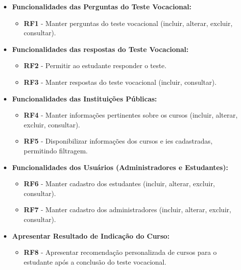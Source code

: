 \begin{itemize}
    \item \textbf{Funcionalidades das Perguntas do Teste Vocacional:}
    \begin{itemize}
        \item \textbf{RF1} - Manter perguntas do teste vocacional (incluir, alterar, excluir, consultar).
    \end{itemize}

    \item \textbf{Funcionalidades das respostas do Teste Vocacional:}
    \begin{itemize}
        \item \textbf{RF2} - Permitir ao estudante responder o teste.
        \item \textbf{RF3} - Manter respostas do teste vocacional (incluir, consultar).
    \end{itemize}

    \item \textbf{Funcionalidades das Instituições Públicas:}
    \begin{itemize}
        \item \textbf{RF4 }- Manter informações pertinentes sobre os cursos (incluir, alterar, excluir, consultar).
        \item \textbf{RF5} - Disponibilizar informações dos cursos e \ac{ies} cadastradas, permitindo filtragem.
    \end{itemize}

    \item \textbf{Funcionalidades dos Usuários (Administradores e Estudantes):}
    \begin{itemize}
        \item \textbf{RF6} - Manter cadastro dos estudantes (incluir, alterar, excluir, consultar).
        \item \textbf{RF7} - Manter cadastro dos administradores (incluir, alterar, excluir, consultar).
    \end{itemize}

    \item \textbf{Apresentar Resultado de Indicação do Curso:}
    \begin{itemize}
        \item \textbf{RF8} - Apresentar recomendação personalizada de cursos para o estudante após a conclusão do teste vocacional.
    \end{itemize}
    
\end{itemize}

